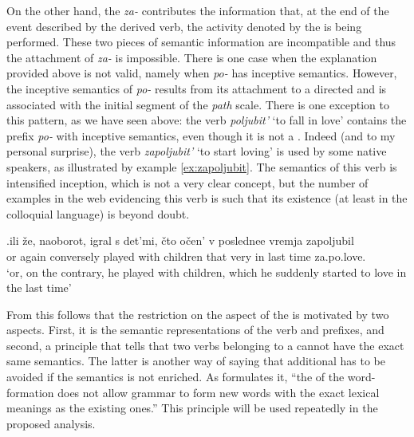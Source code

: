 On the other hand, the  \textit{za-} contributes the information that, at the end of the event described by the derived verb, the activity denoted by the  is being performed. These two pieces of semantic information are incompatible and thus the attachment of \textit{za-} is impossible. There is one case when the explanation provided above is not valid, namely when \textit{po-} has inceptive semantics. However, the inceptive semantics of \textit{po-} results from its attachment to a directed  and is associated with the initial segment of the \textit{path} scale. There is one exception to this pattern, as we have seen above: the verb \textit{poljubit'} `to fall in love' contains the prefix \textit{po-} with inceptive semantics, even though it is not a . Indeed (and to my personal surprise), the verb \textit{zapoljubit'} `to start loving' is used by some native speakers, as illustrated by example \ref{ex:zapoljubit}. The semantics of this verb is intensified inception, which is not a very clear concept, but the number of examples in the web evidencing this verb is such that its existence (at least in the colloquial language) is beyond doubt.

\exg.\label{ex:zapoljubit}ili \v{z}e, naoborot, igral s det'mi, \v{c}to o\v{c}en' v poslednee vremja zapoljubil\\
or again conversely played with children that very in last time za.po.love.\\
\trans `or, on the contrary, he played with children, which he suddenly started to love in the last time'

From this follows that the restriction on the aspect of the  is motivated by two aspects. First, it is the semantic representations of the verb and prefixes, and second, a principle that tells that two verbs belonging to a  cannot have the exact same semantics. The latter is another way of saying that additional  has to be avoided if the semantics is not enriched. As \citet{Braginsky:08} formulates it, ``the  of the word-formation does not allow grammar to form new words with the
exact lexical meanings as the existing ones.'' This principle will be used repeatedly in the proposed analysis.



